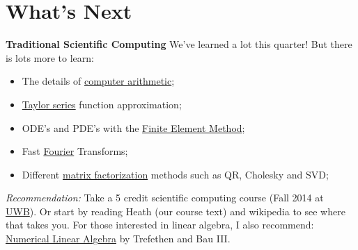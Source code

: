\documentclass[xcolor=dvipsnames]{beamer}
\begin{document}
\section{What's Next}
\begin{frame}
{\bf Traditional Scientific Computing}
We've learned a lot this quarter! But there is lots more to learn: \pause
\begin{itemize}
\item The details of \href{https://www.cise.ufl.edu/~mssz/CompOrg/CDA-arith.html}{computer arithmetic};\pause
\item \href{https://en.wikipedia.org/wiki/Taylor_series}{Taylor series} function approximation; \pause
\item ODE's and PDE's with the \href{https://en.wikipedia.org/wiki/Finite_element_method}{Finite Element Method};\pause
\item Fast \href{https://en.wikipedia.org/wiki/Fourier_series}{Fourier} Transforms;\pause
\item Different \href{https://en.wikipedia.org/wiki/Matrix_decomposition}{matrix factorization} methods such as QR, Cholesky and SVD;\pause
\end{itemize}
\emph{Recommendation: }Take a 5 credit scientific computing course (Fall 2014 at \href{http://www.washington.edu/students/crscatb/css.html\#css455}{UWB}). \pause Or start by reading Heath (our course text) and wikipedia to see where that takes you. For those interested in linear algebra, I also recommend: \href{http://www.amazon.com/Numerical-Linear-Algebra-Lloyd-Trefethen/dp/0898713617}{Numerical Linear Algebra} by Trefethen and Bau III.
 
\end{frame}
\end{document}
